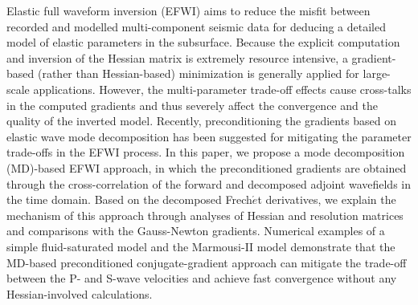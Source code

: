 
\begin{eabstract}
Elastic full waveform inversion (EFWI) aims to reduce the misfit between recorded and modelled multi-component
seismic data for deducing a detailed model of elastic parameters in the subsurface.
Because the explicit computation and inversion of the Hessian matrix
is extremely resource intensive,
a gradient-based (rather than Hessian-based) minimization is generally applied for large-scale applications.
However, the multi-parameter trade-off effects cause cross-talks in the computed gradients and
thus severely affect the convergence and the quality of the inverted model.
Recently, preconditioning the gradients based on elastic wave mode decomposition
has been suggested for mitigating the parameter trade-offs in the EFWI process.
In this paper, we propose a mode decomposition (MD)-based EFWI approach, in which the preconditioned gradients
are obtained through the cross-correlation of the forward and
decomposed adjoint wavefields in the time domain.
Based on the decomposed Frech{$\acute{e}$}t derivatives,
we explain the mechanism of this approach through analyses of Hessian and resolution matrices
and comparisons with the Gauss-Newton gradients.
Numerical examples of a simple fluid-saturated model and the Marmousi-II model
demonstrate that the MD-based preconditioned conjugate-gradient approach
can mitigate the trade-off between the P- and S-wave velocities and achieve fast
convergence without any Hessian-involved calculations.
\end{eabstract}


